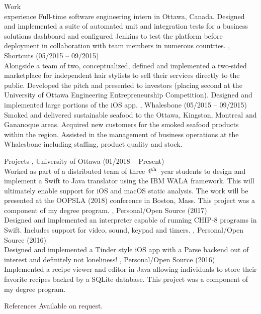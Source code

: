 \documentclass{resume}
\newcommand{\fourth}{$4^{\mbox{\scriptsize th}}$\ }
\begin{document}
\begin{category}{Work \\experience}
Full-time software engineering intern in Ottawa, Canada. Designed and implemented a suite
of automated unit and integration tests for a business solutions dashboard and configured
Jenkins to test the platform before deployment in collaboration with team members in
numerous countries.
, Shortcuts (05/2015 -- 09/2015)\\
Alongside a team of two, conceptualized, defined and implemented a two-sided marketplace for
independent hair stylists to sell their services directly to the public. Developed
the pitch and presented to investors (placing second at the University of
Ottawa Engineering Entrepreneurship Competition). 
Designed and implemented large portions of the iOS app.
, Whalesbone (05/2015 -- 09/2015)\\
Smoked and delivered sustainable seafood to the Ottawa, Kingston, Montreal
and Gananoque areas. Acquired new customers for the smoked seafood products within the region.
Assisted in the management of business operations at the Whalesbone including staffing,
product quality and stock.
\end{category}




\begin{category}{Projects}
, University of Ottawa (01/2018 -- Present)\\
Worked as part of a distributed team of three \fourth year students to
design and implement a Swift to Java translator using the IBM WALA framework.
This will ultimately enable support for iOS and macOS static analysis.
The work will be presented at the OOPSLA (2018) conference in Boston, Mass.
This project was a component of my degree program.
, Personal/Open Source (2017)\\
Designed and implemented an interpreter capable of running CHIP-8 programs in Swift.
Includes support for video, sound, keypad and timers.
, Personal/Open Source (2016)\\
Designed and implemented a Tinder style iOS app with a Parse backend out of interest and 
definitely not loneliness!
, Personal/Open Source (2016)\\
Implemented a recipe viewer and editor in Java allowing individuals to store their
favorite recipes backed by a SQLite database.
This project was a component of my degree program.
\end{category}


\begin{category}{References}
\citemnobullet Available on request.
\end{category}
\end{document}
